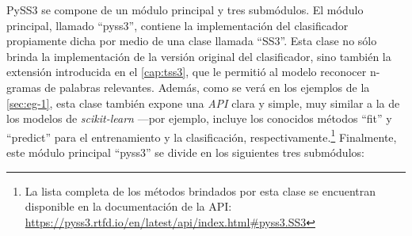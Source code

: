 PySS3 se compone de un módulo principal y tres submódulos.
El módulo principal, llamado ``pyss3'', contiene la implementación del clasificador propiamente dicha por medio de una clase llamada ``SS3''.
Esta clase no sólo brinda la implementación de la versión original del clasificador, sino también la extensión introducida en el \autoref{cap:tss3}, que le permitió al modelo reconocer n-gramas de palabras relevantes.
Además, como se verá en los ejemplos de la \autoref{sec:eg-1}, esta clase también expone una \emph{API} clara y simple, muy similar a la de los modelos de \emph{scikit-learn} ---por ejemplo, incluye los conocidos métodos ``fit'' y ``predict'' para el entrenamiento y la clasificación, respectivamente.\footnote{La lista completa de los métodos brindados por esta clase se encuentran disponible en la documentación de la API:  \href{https://pyss3.rtfd.io/en/latest/api/index.html\#pyss3.SS3}{\url{https://pyss3.rtfd.io/en/latest/api/index.html\#pyss3.SS3}}}
Finalmente, este módulo principal ``pyss3'' se divide en los siguientes tres submódulos:

